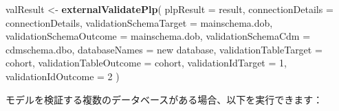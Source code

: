\documentclass[
  11pt]{book}
\newenvironment{Shaded}{\begin{snugshade}}{\end{snugshade}}
\newcommand{\AttributeTok}[1]{\textcolor[rgb]{0.13,0.29,0.53}{#1}}
\newcommand{\DecValTok}[1]{\textcolor[rgb]{0.00,0.00,0.81}{#1}}
\newcommand{\FunctionTok}[1]{\textcolor[rgb]{0.13,0.29,0.53}{\textbf{#1}}}
\newcommand{\NormalTok}[1]{#1}
\newcommand{\OtherTok}[1]{\textcolor[rgb]{0.56,0.35,0.01}{#1}}
\newcommand{\StringTok}[1]{\textcolor[rgb]{0.31,0.60,0.02}{#1}}
\theoremstyle{definition}
\theoremstyle{definition}
\theoremstyle{definition}
\theoremstyle{definition}
\theoremstyle{remark}
\begin{document}
\begin{Shaded}
\begin{Highlighting}[]
\NormalTok{valResult }\OtherTok{\textless{}{-}} \FunctionTok{externalValidatePlp}\NormalTok{(}
    \AttributeTok{plpResult =}\NormalTok{ result,}
    \AttributeTok{connectionDetails =}\NormalTok{ connectionDetails,}
    \AttributeTok{validationSchemaTarget =} \StringTok{\textquotesingle{}mainschema.dob\textquotesingle{}}\NormalTok{,}
    \AttributeTok{validationSchemaOutcome =} \StringTok{\textquotesingle{}mainschema.dob\textquotesingle{}}\NormalTok{,}
    \AttributeTok{validationSchemaCdm =} \StringTok{\textquotesingle{}cdmschema.dbo\textquotesingle{}}\NormalTok{,}
    \AttributeTok{databaseNames =} \StringTok{\textquotesingle{}new database\textquotesingle{}}\NormalTok{,}
    \AttributeTok{validationTableTarget =} \StringTok{\textquotesingle{}cohort\textquotesingle{}}\NormalTok{,}
    \AttributeTok{validationTableOutcome =} \StringTok{\textquotesingle{}cohort\textquotesingle{}}\NormalTok{,}
    \AttributeTok{validationIdTarget =} \DecValTok{1}\NormalTok{,}
    \AttributeTok{validationIdOutcome =} \DecValTok{2}
\NormalTok{)}
\end{Highlighting}
\end{Shaded}

モデルを検証する複数のデータベースがある場合、以下を実行できます：
\end{document}
